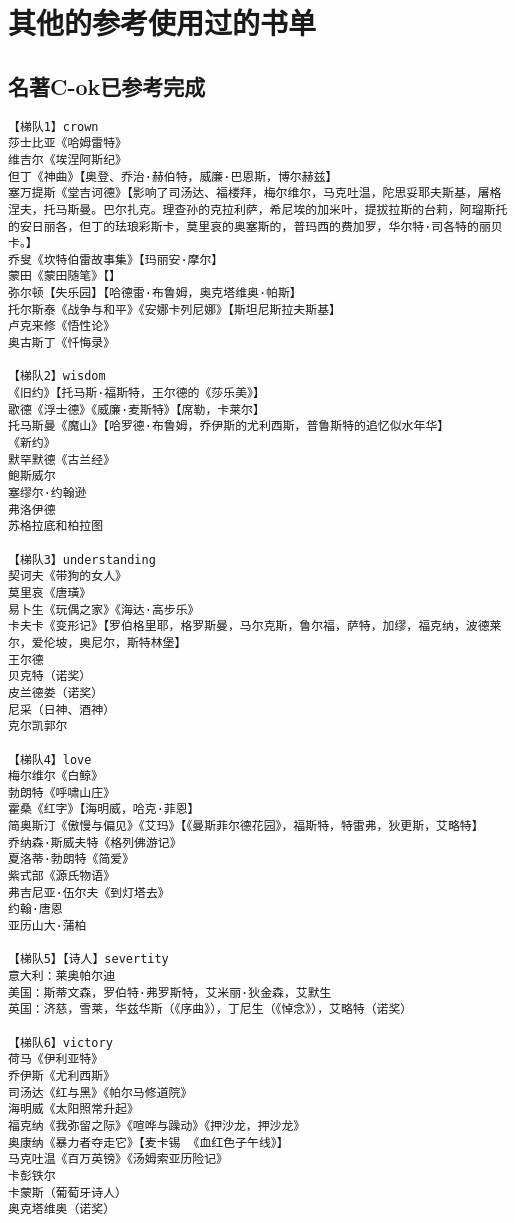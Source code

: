 \documentclass[UTF8]{../RepresentationUniverse}
\begin{document}
\section{其他的参考使用过的书单}


\subsection{名著C-ok已参考完成}

\begin{lstlisting}
【梯队1】crown
莎士比亚《哈姆雷特》
维吉尔《埃涅阿斯纪》
但丁《神曲》【奥登、乔治·赫伯特，威廉·巴恩斯，博尔赫兹】
塞万提斯《堂吉诃德》【影响了司汤达、福楼拜，梅尔维尔，马克吐温，陀思妥耶夫斯基，屠格涅夫，托马斯曼。巴尔扎克。理查孙的克拉利萨，希尼埃的加米叶，提拔拉斯的台莉，阿瑠斯托的安日丽各，但丁的珐琅彩斯卡，莫里哀的奥塞斯的，普玛西的费加罗，华尔特·司各特的丽贝卡。】
乔叟《坎特伯雷故事集》【玛丽安·摩尔】
蒙田《蒙田随笔》【】
弥尔顿【失乐园】【哈德雷·布鲁姆，奥克塔维奥·帕斯】
托尔斯泰《战争与和平》《安娜卡列尼娜》【斯坦尼斯拉夫斯基】
卢克来修《悟性论》
奥古斯丁《忏悔录》

【梯队2】wisdom
《旧约》【托马斯·福斯特，王尔德的《莎乐美》】
歌德《浮士德》《威廉·麦斯特》【席勒，卡莱尔】
托马斯曼《魔山》【哈罗德·布鲁姆，乔伊斯的尤利西斯，普鲁斯特的追忆似水年华】
《新约》
默罕默德《古兰经》
鲍斯威尔
塞缪尔·约翰逊
弗洛伊德
苏格拉底和柏拉图

【梯队3】understanding
契诃夫《带狗的女人》
莫里哀《唐璜》
易卜生《玩偶之家》《海达·高步乐》
卡夫卡《变形记》【罗伯格里耶，格罗斯曼，马尔克斯，鲁尔福，萨特，加缪，福克纳，波德莱尔，爱伦坡，奥尼尔，斯特林堡】
王尔德
贝克特（诺奖）
皮兰德娄（诺奖）
尼采（日神、酒神）
克尔凯郭尔

【梯队4】love
梅尔维尔《白鲸》
勃朗特《呼啸山庄》
霍桑《红字》【海明威，哈克·菲恩】
简奥斯汀《傲慢与偏见》《艾玛》【《曼斯菲尔德花园》，福斯特，特雷弗，狄更斯，艾略特】
乔纳森·斯威夫特《格列佛游记》
夏洛蒂·勃朗特《简爱》
紫式部《源氏物语》
弗吉尼亚·伍尔夫《到灯塔去》
约翰·唐恩
亚历山大·蒲柏

【梯队5】【诗人】severtity
意大利：莱奥帕尔迪
美国：斯蒂文森，罗伯特·弗罗斯特，艾米丽·狄金森，艾默生
英国：济慈，雪莱，华兹华斯（《序曲》），丁尼生（《悼念》），艾略特（诺奖）

【梯队6】victory
荷马《伊利亚特》
乔伊斯《尤利西斯》
司汤达《红与黑》《帕尔马修道院》
海明威《太阳照常升起》
福克纳《我弥留之际》《喧哗与躁动》《押沙龙，押沙龙》
奥康纳《暴力者夺走它》【麦卡锡 《血红色子午线》】
马克吐温《百万英镑》《汤姆索亚历险记》
卡彭铁尔
卡蒙斯（葡萄牙诗人）
奥克塔维奥（诺奖）


\end{lstlisting}
\end{document}
